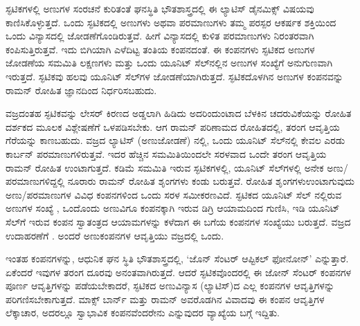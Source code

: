 
ಸ್ಫಟಿಕಗಳಲ್ಲಿ ಅಣುಗಳ ಸಂರಚನೆ ಕುರಿತಂತೆ ಘನಸ್ಥಿತಿ ಭೌತಶಾಸ್ತ್ರದಲ್ಲಿ ಈ ಲ್ಯಾಟಿಸ್ ಡೈನಮಿಕ್ಸ್ ವಿಷಯವು ಕಾಣಿಸಿಕೊಳ್ಳುತ್ತದೆ. ಒಂದು ಸ್ಫಟಿಕದಲ್ಲಿ ಅಣುಗಳು ಅಥವಾ ಪರಮಾಣುಗಳು ತಮ್ಮ ಪರಸ್ಪರ ಆಕರ್ಷಕ ಶಕ್ತಿಯಿಂದ ಒಂದು ವಿನ್ಯಾಸದಲ್ಲಿ ಜೋಡಣೆಗೊಂಡಿರುತ್ತವೆ. ಹೀಗೆ ವಿನ್ಯಾಸದಲ್ಲಿ ಕುಳಿತ ಪರಮಾಣುಗಳು ನಿರಂತರವಾಗಿ ಕಂಪಿಸುತ್ತಿರುತ್ತವೆ. ಇದು ಬಿಗಿಯಾಗಿ ಎಳೆದಿಟ್ಟ ತಂತಿಯ ಕಂಪನದಂತೆ. ಈ ಕಂಪನಗಳು ಸ್ಫಟಿಕದ ಅಣುಗಳ ಜೋಡಣೆಯ ಸಮಮಿತಿ ಲಕ್ಷಣಗಳು ಮತ್ತು ಒಂದು ಯೂನಿಟ್ ಸೆಲ್‍ನಲ್ಲಿನ ಅಣುಗಳ ಸಂಖ್ಯೆಗೆ ಅನುಗುಣವಾಗಿ ಇರುತ್ತದೆ. ಸ್ಫಟಿಕವು ಹಲವು ಯೂನಿಟ್ ಸೆಲ್‍ಗಳ ಜೋಡಣೆಯಾಗಿರುತ್ತದೆ. ಸ್ಫಟಿಕದೊಳಗಿನ ಅಣುಗಳ ಕಂಪನವನ್ನು ರಾಮನ್ ರೋಹಿತ  ಜ್ಞಾನದಿಂದ ನಿರ್ಧರಿಸಬಹುದು.

ವಜ್ರದಂತಹ ಸ್ಫಟಿಕವನ್ನು ಲೇಸರ್ ಕಿರಣದ ಅಡ್ಡಲಾಗಿ ಹಿಡಿದು ಅದರಿಂದುಂಟಾದ ಬೆಳಕಿನ ಚದರುವಿಕೆಯನ್ನು ರೋಹಿತ ದರ್ಶಕದ ಮೂಲಕ ವಿಶ್ಲೇಷಣೆಗೆ ಒಳಪಡಿಸಬೇಕು. ಆಗ ರಾಮನ್ ಪರಿಣಾಮದ ರೋಹಿತದಲ್ಲಿ,  ತರಂಗ ಆವೃತ್ತಿಯ ಗೆರೆಯನ್ನು ಕಾಣಬಹುದು. ವಜ್ರದ ಲ್ಯಾಟಿಸ್ (ಅಣುಜೋಡಣೆ) ನಲ್ಲಿ, ಒಂದು ಯೂನಿಟ್ ಸೆಲ್‍ನಲ್ಲಿ ಕೇವಲ ಎರಡು ಕಾರ್ಬನ್ ಪರಮಾಣುಗಳಿರುತ್ತವೆ. ಇದರ ಹೆಚ್ಚಿನ ಸಮಮಿತಿಯಿಂದಲೇ ಸರಳವಾದ ಒಂದೇ ತರಂಗ ಆವೃತ್ತಿಯ ರಾಮನ್ ರೋಹಿತ  ಉಂಟಾಗುತ್ತದೆ. ಕಡಿಮೆ ಸಮಮಿತಿ ಇರುವ ಸ್ಫಟಿಕಗಳಲ್ಲಿ, ಯೂನಿಟ್ ಸೆಲ್‍ಗಳಲ್ಲಿ ಅನೇಕ ಅಣು/ಪರಮಾಣುಗಳಿದ್ದಲ್ಲಿ ನೂರಾರು ರಾಮನ್ ರೋಹಿತ  ಶೃಂಗಗಳು ಕಂಡು ಬರುತ್ತವೆ. ರೋಹಿತ ಶೃಂಗಗಳು\break ಉಂಟಾಗುವುದು ಅಣು/ಪರಮಾಣುಗಳ ವಿವಿಧ ಕಂಪನಗಳಿಂದ ಒಂದು ಸರಳ ಸಮೀಕರಣವಿದೆ. ಸ್ಫಟಿಕದ ಯೂನಿಟ್ ಸೆಲ್ ನಲ್ಲಿರುವ ಅಣುಗಳ ಸಂಖ್ಯೆ \enginline{-} , ಒಂದೊಂದು ಅಣುವಿಗೂ ಕಂಪನಕ್ಕಾಗಿ ಇರುವ  ಡಿಗ್ರಿ ಆಯಾಮದಿಂದ ಗುಣಿಸಿ, ಇಡಿ ಯೂನಿಟ್ ಸೆಲ್‍ಗೆ ಇರುವ ಕಂಪನ ಸ್ವಾತಂತ್ರದ ಆಯಾಮಗಳನ್ನು ಕಳೆದಾಗ \enginline{-} ಈ ಬಗೆಯ ಕಂಪನಗಳ ಸಂಖ್ಯೆಯು ಬರುತ್ತದೆ. ವಜ್ರದ ಉದಾಹರಣೆಗೆ . ಅಂದರೆ  ಅಣುಕಂಪನಗಳ ಆವೃತ್ತಿಯು ವಜ್ರದಲ್ಲಿ ಒಂದು.

ಇಂತಹ ಕಂಪನಗಳನ್ನು, ಆಧುನಿಕ ಘನ ಸ್ಥಿತಿ ಭೌತಶಾಸ್ತ್ರದಲ್ಲಿ, ‘ಜೊನ್ ಸೆಂಟರ್ ಆಪ್ಟಿಕಲ್ ಫೋನೋನ್’ ಎನ್ನುತ್ತಾರೆ. ಏಕೆಂದರೆ ಇವುಗಳ ತರಂಗ ದೂರವು ಅನಂತವಾಗಿರುತ್ತದೆ. ಆದರೆ ಸ್ಫಟಿಕವೊಂದರಲ್ಲಿ ಈ ಜೋನ್ ಸೆಂಟರ್ ಕಂಪನಗಳ ಪೂರ್ಣ ಆವೃತ್ತಿಗಳನ್ನು ಪಡೆಯಬೇಕಾದರೆ, ಸ್ಫಟಿಕದ ಅಣುವಿನ್ಯಾಸ (ಲ್ಯಾಟಿಸ್)ದ ಎಲ್ಲ ಕಂಪನಗಳ ಆವೃತ್ತಿಗಳನ್ನು ಪರಿಗಣಿಸಬೇಕಾಗುತ್ತದೆ. ಮಾಕ್ಸ್ ಬಾರ್ನ್ ಮತ್ತು ರಾಮನ್ ಅವರೊಡಗಿನ ವಿವಾದವು ಈ ಕಂಪನ ಆವೃತ್ತಿಗಳ ಲೆಕ್ಕಾಚಾರ, ಅದರಲ್ಲೂ ಸ್ವಾಭಾವಿಕ ಕಂಪನವೆಂದರೇನು ಎನ್ನುವುದರ ವ್ಯಾಖ್ಯೆಯ ಬಗ್ಗೆ ಇದ್ದಿತು.

